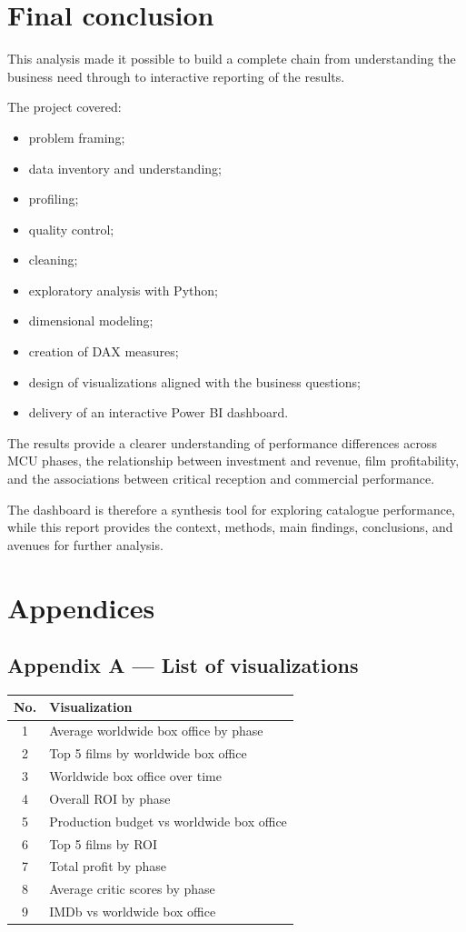 \documentclass[a4paper,11pt]{article}
\begin{document}
\section{Final conclusion}

This analysis made it possible to build a complete chain from
understanding the business need through to interactive reporting of the
results.

The project covered:
\begin{itemize}
  \item problem framing;
  \item data inventory and understanding;
  \item profiling;
  \item quality control;
  \item cleaning;
  \item exploratory analysis with Python;
  \item dimensional modeling;
  \item creation of DAX measures;
  \item design of visualizations aligned with the business questions;
  \item delivery of an interactive Power BI dashboard.
\end{itemize}

The results provide a clearer understanding of performance differences
across MCU phases, the relationship between investment and revenue,
film profitability, and the associations between critical reception and
commercial performance.

The dashboard is therefore a synthesis tool for exploring catalogue
performance, while this report provides the context, methods, main
findings, conclusions, and avenues for further analysis.

\section{Appendices}

\subsection{Appendix A --- List of visualizations}

\begin{tabularx}{\linewidth}{@{}c X@{}}
  \toprule
  \textbf{No.} & \textbf{Visualization} \\
  \midrule
  1 & Average worldwide box office by phase \\
  2 & Top 5 films by worldwide box office \\
  3 & Worldwide box office over time \\
  4 & Overall ROI by phase \\
  5 & Production budget vs worldwide box office \\
  6 & Top 5 films by ROI \\
  7 & Total profit by phase \\
  8 & Average critic scores by phase \\
  9 & IMDb vs worldwide box office \\
  \bottomrule
\end{tabularx}
\end{document}
